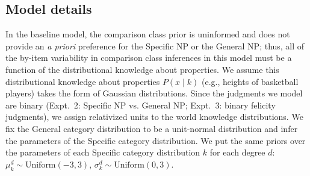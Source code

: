 \documentclass[doc]{apa6}
\begin{document}

\subsection{Model details}


In the baseline model, the comparison class prior is uninformed and does not provide an \emph{a priori} preference for the Specific NP or the General NP; thus, all of the by-item variability in comparison class inferences in this model must be a function of the distributional knowledge about properties.
We assume this distributional knowledge about properties $P(x \mid k)$ (e.g., heights of basketball players) takes the form of Gaussian distributions. Since the judgments we model are binary (Expt.~2: Specific NP vs. General NP; Expt.~3: binary felicity judgments), we assign relativized units to the world knowledge distributions. We fix the General category distribution to be a unit-normal distribution and infer the parameters of the Specific category distribution. 
We put the same priors over the parameters of each Specific category distribution $k$ for each degree $d$: $\mu^d_k \sim \text{Uniform}(-3, 3)$, $\sigma^d_k \sim \text{Uniform}(0, 3)$.
\end{document}
